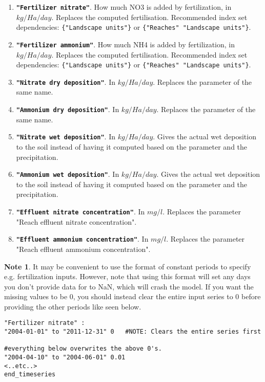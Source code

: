 \documentclass[11pt]{article}
\theoremstyle{definition}
\newtheorem{mynote}{Note}
\newenvironment{note}%
  {\begin{lrbox}{\notebox}%
   \begin{minipage}{\dimexpr\linewidth-2\fboxsep}
   \begin{mynote}}%
  {\end{mynote}%
   \end{minipage}%
   \end{lrbox}%
   \begin{trivlist}
     \item[]\colorbox{silver}{\usebox\notebox}
   \end{trivlist}}
\begin{document}
\begin{enumerate}[i]
\item {\bf\tt "Fertilizer nitrate"}. How much NO3 is added by fertilization, in $kg/Ha/day$. Replaces the computed fertilisation. Recommended index set dependencies: {\tt \{"Landscape units"\}} or {\tt \{"Reaches" "Landscape units"\}}.
\item {\bf\tt "Fertilizer ammonium"}. How much NH4 is added by fertilization, in $kg/Ha/day$. Replaces the computed fertilisation. Recommended index set dependencies: {\tt \{"Landscape units"\}} or {\tt \{"Reaches" "Landscape units"\}}.
\item {\bf\tt "Nitrate dry deposition"}. In $kg/Ha/day$. Replaces the parameter of the same name.
\item {\bf\tt "Ammonium dry deposition"}. In $kg/Ha/day$. Replaces the parameter of the same name.
\item {\bf\tt "Nitrate wet deposition"}. In $kg/Ha/day$. Gives the actual wet deposition to the soil instead of having it computed based on the parameter and the precipitation.
\item {\bf\tt "Ammonium wet deposition"}. In $kg/Ha/day$. Gives the actual wet deposition to the soil instead of having it computed based on the parameter and the precipitation.
\item {\bf\tt "Effluent nitrate concentration"}. In $mg/l$. Replaces the parameter "Reach effluent nitrate concentration".
\item {\bf\tt "Effluent ammonium concentration"}. In $mg/l$. Replaces the parameter "Reach effluent ammonium concentration".
\end{enumerate}

\begin{note}
It may be convenient to use the format of constant periods to specify e.g. fertilization inputs. However, note that using this format will set any days you don't provide data for to NaN, which will crash the model. If you want the missing values to be 0, you should instead clear the entire input series to 0 before providing the other periods like seen below.
\begin{lstlisting}
"Fertilizer nitrate" :
"2004-01-01" to "2011-12-31" 0   #NOTE: Clears the entire series first

#everything below overwrites the above 0's.
"2004-04-10" to "2004-06-01" 0.01
<..etc..>
end_timeseries
\end{lstlisting}
\end{note}
\end{document}
